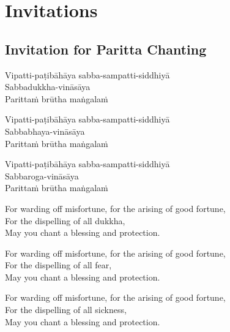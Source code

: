 \section{Invitations}

\subsection{Invitation for Paritta Chanting}
\label{paritta-invitation-for-chanting}


\vspace*{5pt}

\enlargethispage{\baselineskip}

\begin{paritta}


Vipatti-paṭibāhāya sabba-sampatti-siddhiyā\\
Sabbadukkha-vināsāya\\
Parittaṁ brūtha maṅgalaṁ

Vipatti-paṭibāhāya sabba-sampatti-siddhiyā\\
Sabbabhaya-vināsāya\\
Parittaṁ brūtha maṅgalaṁ

Vipatti-paṭibāhāya sabba-sampatti-siddhiyā\\
Sabbaroga-vināsāya\\
Parittaṁ brūtha maṅgalaṁ

\end{paritta}

\begin{english}
  For warding off misfortune, for the arising of good fortune,\\
  For the dispelling of all dukkha,\\
  May you chant a blessing and protection.

  For warding off misfortune, for the arising of good fortune,\\
  For the dispelling of all fear,\\
  May you chant a blessing and protection.

  For warding off misfortune, for the arising of good fortune,\\
  For the dispelling of all sickness,\\
  May you chant a blessing and protection.
\end{english}

